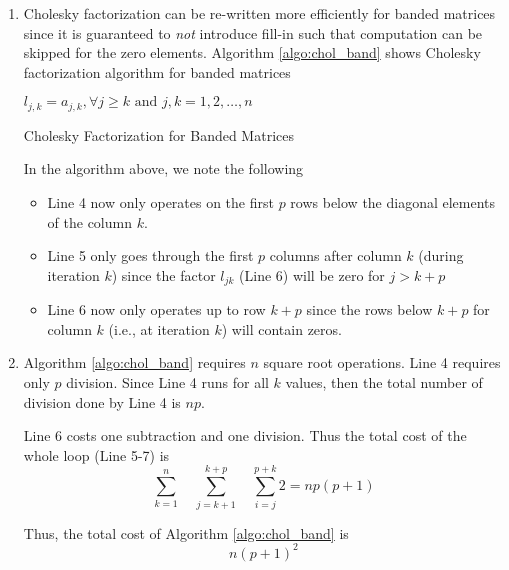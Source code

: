 \begin{enumerate}
\item Cholesky factorization can be re-written more efficiently for banded matrices since it is guaranteed to \emph{not} introduce fill-in such that computation can be skipped for the zero elements. Algorithm \ref{algo:chol_band} shows Cholesky factorization algorithm for banded matrices 

\begin{algorithm}[H]
\SetAlgoLined
{}
 $l_{j,k} = a_{j,k}, \forall j\geq k \text{\ and\ }  j,k= 1,2, \ldots, n$ \\
 \caption{Cholesky Factorization for Banded Matrices}
\label{algo:chol_band}
\end{algorithm}


In the algorithm above, we note the following 
\begin{itemize}
\item Line 4 now only operates on the first $p$ rows below the diagonal elements of the column $k$.
\item  Line 5 only goes through the first $p$ columns after column $k$ (during iteration $k$) since the factor $l_{jk}$ (Line 6) will be zero for $j > k+p$
\item Line 6 now only operates up to row $k+p$ since the rows below $k+p$ for column $k$ (i.e., at iteration $k$) will contain zeros. 
\end{itemize}

\item Algorithm \ref{algo:chol_band} requires $n$ square root operations. Line 4 requires only $p$ division. Since Line 4 runs for all $k$ values, then the total number of division done by Line 4 is $np$. 

Line 6 costs one subtraction and one division. Thus the total cost of the whole loop (Line 5-7) is 
$$
\sum_{k=1}^{n}\quad \sum_{j=k+1}^{k+p}\quad \sum_{i=j}^{p+k} 2 = np(p+1)
$$

Thus, the total cost of Algorithm \ref{algo:chol_band} is
$$
n(p+1)^{2}
$$

\end{enumerate}